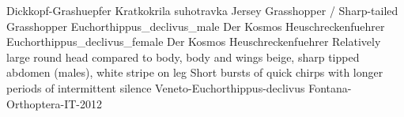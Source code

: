 {Dickkopf-Grashuepfer} %
{Kratkokrila suhotravka} %
{Jersey Grasshopper / Sharp-tailed Grasshopper} %
{Euchorthippus_declivus_male} %
{Der Kosmos Heuschreckenfuehrer} %
{Euchorthippus_declivus_female} %
{Der Kosmos Heuschreckenfuehrer} %
{Relatively large round head compared to body, body and wings beige, sharp tipped abdomen (males), white stripe on leg} %
{Short bursts of quick chirps with longer periods of intermittent silence} %
{Veneto-Euchorthippus-declivus} %
{Fontana-Orthoptera-IT-2012} %

